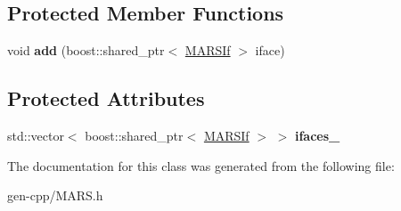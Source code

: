 \subsection*{Protected Member Functions}
\begin{DoxyCompactItemize}
\item 
\mbox{\label{classMARS_1_1MARSMultiface_a3af2c2f1319f8c37e6aacfe87e4d7c5b}} 
void {\bfseries add} (boost\+::shared\+\_\+ptr$<$ \hyperlink{classMARS_1_1MARSIf}{M\+A\+R\+S\+If} $>$ iface)
\end{DoxyCompactItemize}
\subsection*{Protected Attributes}
\begin{DoxyCompactItemize}
\item 
\mbox{\label{classMARS_1_1MARSMultiface_a1de93b18505fbdf11175313509f40b7b}} 
std\+::vector$<$ boost\+::shared\+\_\+ptr$<$ \hyperlink{classMARS_1_1MARSIf}{M\+A\+R\+S\+If} $>$ $>$ {\bfseries ifaces\+\_\+}
\end{DoxyCompactItemize}


The documentation for this class was generated from the following file\+:\begin{DoxyCompactItemize}
\item 
gen-\/cpp/M\+A\+R\+S.\+h\end{DoxyCompactItemize}
